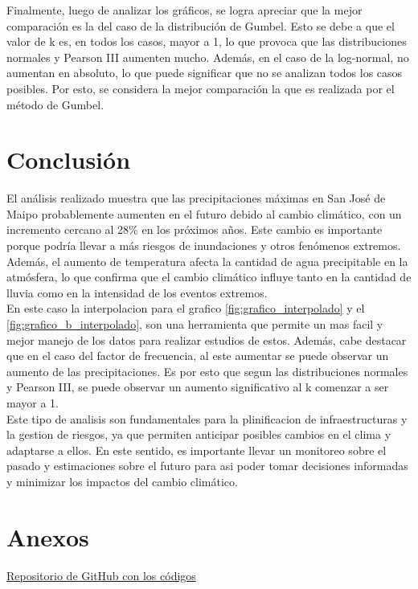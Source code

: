 \documentclass{article}  %
\begin{document}
Finalmente, luego de analizar los gráficos, se logra apreciar que la mejor comparación es la del caso de la distribución de Gumbel. Esto se debe a que el valor de k es, en todos los casos, mayor a 1, lo que provoca que las distribuciones normales y Pearson III aumenten mucho. Además, en el caso de la log-normal, no aumentan en absoluto, lo que puede significar que no se analizan todos los casos posibles. Por esto, se considera la mejor comparación la que es realizada por el método de Gumbel.

\newpage
\section{Conclusión}

El análisis realizado muestra que las precipitaciones máximas en San José de Maipo probablemente aumenten en el futuro debido al cambio climático, con un incremento cercano al 28\% en los próximos años. Este cambio es importante porque podría llevar a más riesgos de inundaciones y otros fenómenos extremos. Además, el aumento de temperatura afecta la cantidad de agua precipitable en la atmósfera, lo que confirma que el cambio climático influye tanto en la cantidad de lluvia como en la intensidad de los eventos extremos. \\
En este caso la interpolacion para el grafico \ref{fig:grafico_interpolado} y el \ref{fig:grafico_b_interpolado}, son una herramienta que permite un mas facil y mejor manejo de los datos para realizar estudios de estos. Además, cabe destacar que en el caso del factor de frecuencia, al este aumentar se puede observar un aumento de las precipitaciones. Es por esto que segun las distribuciones normales y Pearson III, se puede observar un aumento significativo al k comenzar a ser mayor a 1. \\
Este tipo de analisis son fundamentales para la plinificacion de infraestructuras y la gestion de riesgos, ya que permiten anticipar posibles cambios en el clima y adaptarse a ellos. En este sentido, es importante llevar un monitoreo sobre el pasado y estimaciones sobre el futuro para asi poder tomar decisiones informadas y minimizar los impactos del cambio climático.

\newpage
\section{Anexos}

\href{https://github.com/LukasWolff2002/TAREA_2_HIDROLOGIA}{Repositorio de GitHub con los códigos}
\end{document}
